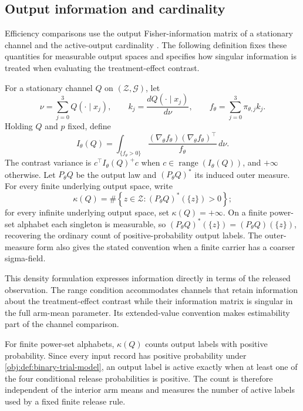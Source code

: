 \documentclass[11pt]{article}
\begin{document}
\subsection{Output information and cardinality}

Efficiency comparisons use the output Fisher-information matrix  of a stationary channel and the active-output cardinality . The following definition fixes these quantities for measurable output spaces and specifies how singular information is treated when evaluating the treatment-effect contrast.

For a stationary channel \(Q\) on \((\mathcal Z,\mathcal G)\), let
\[
\nu=\sum_{j=0}^3 Q(\mathord\cdot\mid x_j),
\qquad
k_j=\frac{dQ(\mathord\cdot\mid x_j)}{d\nu},
\qquad
f_\theta=\sum_{j=0}^3\pi_{\theta,j}k_j.
\]
Holding \(Q\) and \(p\) fixed, define
\[
I_\theta(Q)
=
\int_{\{f_\theta>0\}}
\frac{(\nabla_\theta f_\theta)(\nabla_\theta f_\theta)^\top}{f_\theta}\,d\nu.
\]
The contrast variance is \(c^\top I_\theta(Q)^+c\) when
\(c\in\operatorname{range}(I_\theta(Q))\), and \(+\infty\) otherwise. Let \(P_\theta Q\) be the output law and \((P_\theta Q)^*\) its induced outer measure. For every finite underlying output space, write
\[
\kappa(Q)
=
\#\left\{z\in\mathcal Z:
 (P_\theta Q)^*(\{z\})>0\right\};
\]
for every infinite underlying output space, set \(\kappa(Q)=+\infty\). On a finite power-set alphabet each singleton is measurable, so \((P_\theta Q)^*(\{z\})=(P_\theta Q)(\{z\})\), recovering the ordinary count of positive-probability output labels. The outer-measure form also gives the stated convention when a finite carrier has a coarser sigma-field.

This density formulation expresses information directly in terms of the released observation. The range condition accommodates channels that retain information about the treatment-effect contrast while their information matrix is singular in the full arm-mean parameter. Its extended-value convention makes estimability part of the channel comparison.

For finite power-set alphabets, \(\kappa(Q)\) counts output labels with positive probability. Since every input record has positive probability under \cref{obj:def:binary-trial-model}, an output label is active exactly when at least one of the four conditional release probabilities is positive. The count is therefore independent of the interior arm means and measures the number of active labels used by a fixed finite release rule.
\end{document}
